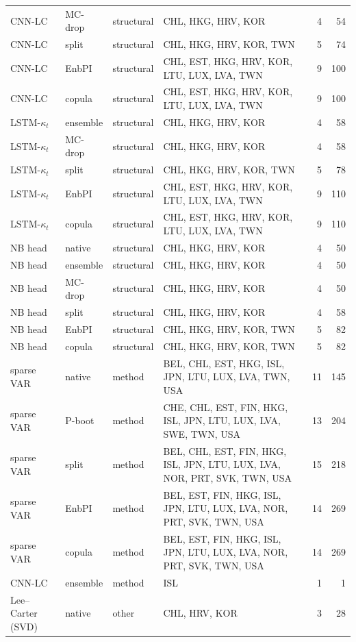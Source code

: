{\begin{longtable}{@{}llp{1.5cm}p{5.6cm}rr@{}}
CNN-LC & MC-drop & structural & CHL, HKG, HRV, KOR & 4 & 54 \\
CNN-LC & split & structural & CHL, HKG, HRV, KOR, TWN & 5 & 74 \\
CNN-LC & EnbPI & structural & CHL, EST, HKG, HRV, KOR, LTU, LUX, LVA, TWN & 9 & 100 \\
CNN-LC & copula & structural & CHL, EST, HKG, HRV, KOR, LTU, LUX, LVA, TWN & 9 & 100 \\
LSTM-$\kappa_t$ & ensemble & structural & CHL, HKG, HRV, KOR & 4 & 58 \\
LSTM-$\kappa_t$ & MC-drop & structural & CHL, HKG, HRV, KOR & 4 & 58 \\
LSTM-$\kappa_t$ & split & structural & CHL, HKG, HRV, KOR, TWN & 5 & 78 \\
LSTM-$\kappa_t$ & EnbPI & structural & CHL, EST, HKG, HRV, KOR, LTU, LUX, LVA, TWN & 9 & 110 \\
LSTM-$\kappa_t$ & copula & structural & CHL, EST, HKG, HRV, KOR, LTU, LUX, LVA, TWN & 9 & 110 \\
NB head & native & structural & CHL, HKG, HRV, KOR & 4 & 50 \\
NB head & ensemble & structural & CHL, HKG, HRV, KOR & 4 & 50 \\
NB head & MC-drop & structural & CHL, HKG, HRV, KOR & 4 & 50 \\
NB head & split & structural & CHL, HKG, HRV, KOR & 4 & 58 \\
NB head & EnbPI & structural & CHL, HKG, HRV, KOR, TWN & 5 & 82 \\
NB head & copula & structural & CHL, HKG, HRV, KOR, TWN & 5 & 82 \\
sparse VAR & native & method & BEL, CHL, EST, HKG, ISL, JPN, LTU, LUX, LVA, TWN, USA & 11 & 145 \\
sparse VAR & P-boot & method & CHE, CHL, EST, FIN, HKG, ISL, JPN, LTU, LUX, LVA, SWE, TWN, USA & 13 & 204 \\
sparse VAR & split & method & BEL, CHL, EST, FIN, HKG, ISL, JPN, LTU, LUX, LVA, NOR, PRT, SVK, TWN, USA & 15 & 218 \\
sparse VAR & EnbPI & method & BEL, EST, FIN, HKG, ISL, JPN, LTU, LUX, LVA, NOR, PRT, SVK, TWN, USA & 14 & 269 \\
sparse VAR & copula & method & BEL, EST, FIN, HKG, ISL, JPN, LTU, LUX, LVA, NOR, PRT, SVK, TWN, USA & 14 & 269 \\
CNN-LC & ensemble & method & ISL & 1 & 1 \\
Lee--Carter (SVD) & native & other & CHL, HRV, KOR & 3 & 28 \\

\end{longtable}}
